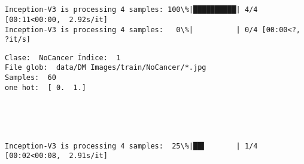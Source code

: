 \documentclass[11pt]{article}
\begin{document}
    \begin{center}
    \end{center}
    { \hspace*{\fill} \\}
    
    \begin{center}
    \end{center}
    { \hspace*{\fill} \\}
    
    \begin{Verbatim}[commandchars=\\\{\}]
Inception-V3 is processing 4 samples: 100\%|██████████| 4/4 [00:11<00:00,  2.92s/it]
Inception-V3 is processing 4 samples:   0\%|          | 0/4 [00:00<?, ?it/s]
    \end{Verbatim}

    \begin{Verbatim}[commandchars=\\\{\}]
Clase:  NoCancer Índice:  1
File glob:  data/DM Images/train/NoCancer/*.jpg
Samples:  60
one hot:  [ 0.  1.]

    \end{Verbatim}

    \begin{center}
    \end{center}
    { \hspace*{\fill} \\}
    
    \begin{center}
    \end{center}
    { \hspace*{\fill} \\}
    
    \begin{Verbatim}[commandchars=\\\{\}]
Inception-V3 is processing 4 samples:  25\%|██▌       | 1/4 [00:02<00:08,  2.91s/it]
    \end{Verbatim}

    \begin{center}
    \end{center}
    { \hspace*{\fill} \\}
    
\end{document}
